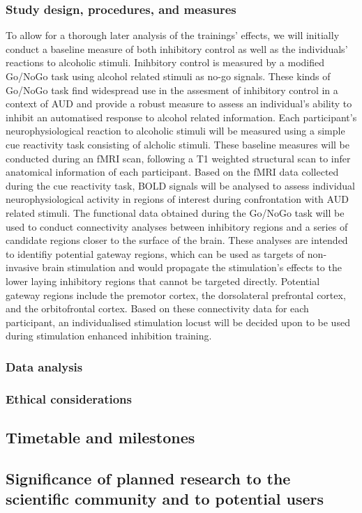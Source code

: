 \documentclass[12pt]{article}
\begin{document}
\lipsum[1-2]

\subsubsection{Study design, procedures, and measures}

To allow for a thorough later analysis of the trainings' effects, we will initially conduct a baseline measure of both inhibitory control as well as the individuals' reactions to alcoholic stimuli. Inihbitory control is measured by a modified Go/NoGo task using alcohol related stimuli as no-go signals. These kinds of Go/NoGo task find widespread use in the assesment of inhibitory control in a context of AUD and provide a robust measure to assess an individual's ability to inhibit an automatised response to alcohol related information. Each participant's neurophysiological reaction to alcoholic stimuli will be measured using a simple cue reactivity task consisting of alcholic stimuli. These baseline measures will be conducted during an fMRI scan, following a T1 weighted structural scan to infer anatomical information of each participant.
Based on the fMRI data collected during the cue reactivity task, BOLD signals will be analysed to assess individual neurophysiological activity in regions of interest during confrontation with AUD related stimuli. The functional data obtained during the Go/NoGo task will be used to conduct connectivity analyses between inhibitory regions and a series of candidate regions closer to the surface of the brain. These analyses are intended to identifiy potential gateway regions, which can be used as targets of non-invasive brain stimulation and would propagate the stimulation's effects to the lower laying inhibitory regions that cannot be targeted directly. Potential gateway regions include the premotor cortex, the dorsolateral prefrontal cortex, and the orbitofrontal cortex. Based on these connectivity data for each participant, an individualised stimulation locust will be decided upon to be used during stimulation enhanced inhibition training.

\subsubsection{Data analysis}

\lipsum[1-3]

\subsubsection{Ethical considerations}

\lipsum[1-2]

\subsection{Timetable and milestones}

\lipsum[1-2]

\subsection{Significance of planned research to the scientific community and to potential users}

\lipsum[1-2]

\printbibliography  
\end{document}
